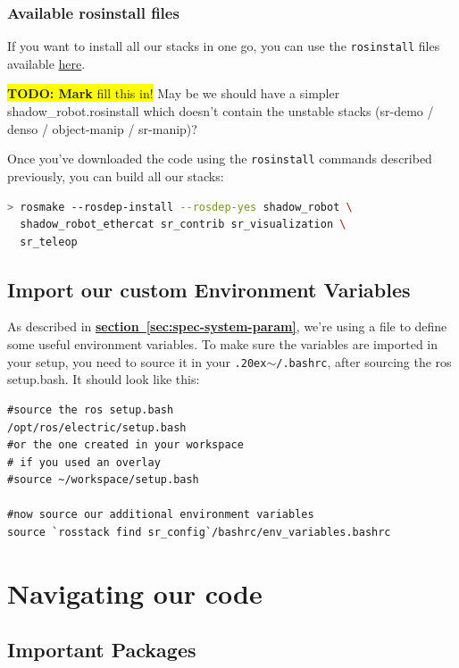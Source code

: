 \documentclass[12pt]{article}
\newcommand{\todo}[1]{\colorbox{yellow}{\textbf{TODO: #1} fill this in!}}
\newcommand{\linuxtilde}{\raise.20ex\hbox{$\scriptstyle\mathtt{\sim}$}}
\newcommand{\link}[1]{\hyperref[sec:#1]{\textbf{section~\ref*{sec:#1}}}}
\begin{document}
\subsubsection{Available rosinstall files}
\par If you want to install all our stacks in one go, you can use the \texttt{rosinstall} files available \href{http://bazaar.launchpad.net/~shadowrobot/sr-build-tools/trunk/view/head:/data/shadow_robot.rosinstall}{here}.

\todo{Mark} May be we should have a simpler shadow\_robot.rosinstall which doesn't contain the unstable stacks (sr-demo / denso / object-manip / sr-manip)?

\par Once you've downloaded the code using the \texttt{rosinstall} commands described previously, you can build all our stacks:
  \begin{lstlisting}[escapeinside='', language=Bash]
> rosmake --rosdep-install --rosdep-yes shadow_robot \
  shadow_robot_ethercat sr_contrib sr_visualization \
  sr_teleop
  \end{lstlisting}

\subsection{Import our custom Environment Variables}
\label{sec:import-vars}
\par As described in \link{spec-system-param}, we're using a file to define some useful environment variables. To make sure the variables are imported in your setup, you need to source it in your \texttt{\linuxtilde/.bashrc}, after sourcing the ros setup.bash. It should look like this:
  \begin{lstlisting}[title={\textbf{\linuxtilde/.bashrc}}, upquote=true]
#source the ros setup.bash
/opt/ros/electric/setup.bash
#or the one created in your workspace
# if you used an overlay
#source ~/workspace/setup.bash

#now source our additional environment variables
source `rosstack find sr_config`/bashrc/env_variables.bashrc
  \end{lstlisting}

\newpage

\section{Navigating our code}
\label{sec:navigate}

\subsection{Important Packages}
\label{sec:important-packages}
\end{document}

